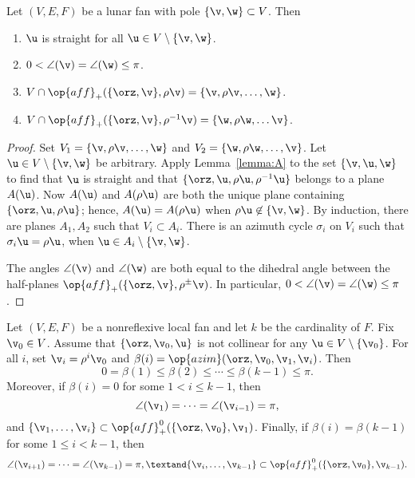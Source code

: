 \begin{lemma}
\label{lemma:lunar}
Let $(V,E,F)$ be a lunar fan with pole $\{\v,\w\}\subset V$.  
Then
\begin{enumerate}\wasitemize 
\item $\u$ is straight for all $\u\in V\setminus \{\v,\w\}$. \vspace{3pt}
\item $0< \angle(\v) = \angle(\w)\le \pi$. \vspace{3pt}
\item $V\cap \op{aff}_+(\{\orz,\v\},\rho \v) = \{\v,\rho \v,\ldots,
\w\}$. \vspace{3pt}
\item $V \cap \op{aff}_+(\{\orz,\v\},\rho^{-1} \v) = \{\w,\rho
\w,\ldots \v\}$. \vspace{3pt}
\end{enumerate}\wasitemize 
\end{lemma}

\begin{proof} Set $V_1 = \{\v,\rho \v,\ldots,\w\}$ and $V_2 =
\{\w,\rho \w,\ldots,\v\}$.  Let $\u\in V\setminus\{\v,\w\}$ be
arbitrary.  Apply Lemma~\ref{lemma:A} to the set $\{\v,\u,\w\}$ to
find that $\u$ is straight and that $\{\orz,\u,\rho \u,\rho^{-1} \u\}$
belongs to a plane $A(\u)$.  Now $A(\u)$ and $A(\rho \u)$ are both
the unique plane containing $\{\orz,\u,\rho \u\}$; hence, $A(\u) =
A(\rho \u)$ when $\rho \u\not\in \{\v,\w\}$.  By induction, there
are planes $A_1, A_2$ such that $V_i\subset A_i$.  There is an
azimuth cycle $\sigma_i$ on $V_i$ such that $\sigma_i \u = \rho \u$,
when $\u \in A_i\setminus \{\v,\w\}$.

The angles $\angle(\v)$ and $\angle(\w)$ are both equal to the
dihedral angle between the half-planes
$\op{aff}_+(\{\orz,\v\},\rho^{\pm}\v)$.  In particular,
$0<\angle(\v)=\angle(\w)\le\pi$.
\end{proof}




\begin{lemma}[monotonicity] 
\label{lemma:monotone}
Let $(V,E,F)$ be a nonreflexive local fan and let $k$ be the cardinality
of $F$.  Fix $\v_0\in V$.  Assume that
$\{\orz,\v_0,\u\}$ is not collinear for any $\u\in
V\setminus\{\v_0\}$.  For all $i$, set $\v_i = \rho^i \v_0$ and
$\beta(i) = \op{azim}(\orz,\v_0,\v_1,\v_i)$.  Then
\[ 0=\beta(1)\le \beta(2)\le \cdots\le
\beta(k-1)\le\pi.\] 
Moreover, if $\beta(i)=0$ for some $1<i \le k-1$, then
\[ 
\angle(\v_1) = \cdots = \angle(\v_{i-1}) = \pi,
\] 
and $\{\v_1,\ldots,\v_i\} \subset \op{aff}^0_+(\{\orz,\v_0\},\v_1)$.
Finally, if $\beta(i)=\beta(k-1)$ for some $1\le i<k-1$, then 
\[ 
\angle(\v_{i+1}) = \cdots = \angle(\v_{k-1}) = \pi,
\textand  \{\v_i,\ldots,\v_{k-1}\} \subset
\op{aff}^0_+(\{\orz,\v_0\},\v_{k-1}).
\]
\end{lemma}

